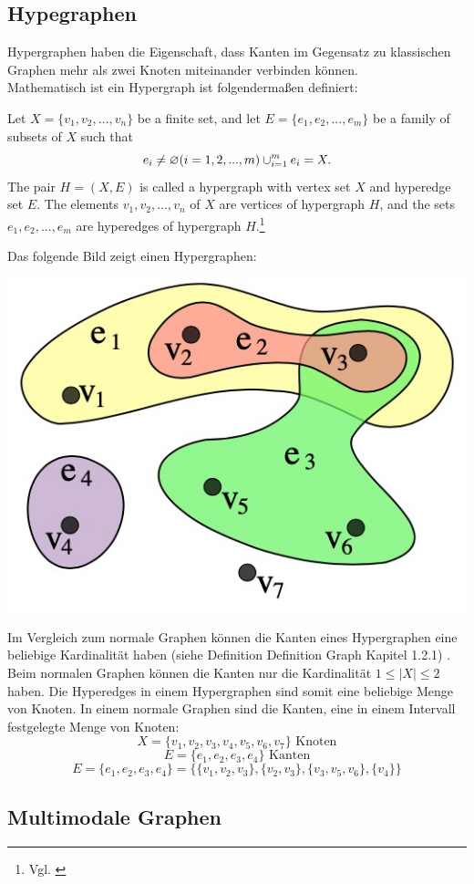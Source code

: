 \subsection{Hypegraphen}
Hypergraphen haben die Eigenschaft, dass Kanten im Gegensatz zu klassischen Graphen mehr als zwei Knoten miteinander verbinden können.
\\Mathematisch ist ein Hypergraph ist folgendermaßen definiert:
\begin{definition}
	Let $X=\{v_{1}, v_{2},...,v_{n}\}$ be a finite set,
	and let $E=\{e_{1},e_{2},...,e_{m}\}$ be a family of subsets of $X$ such that
	\[e_{i} \neq \varnothing (i=1,2,...,m) \\
	\cup_{i=1}^{m}e_{i}=X.
	\]
	The pair $H=(X,E)$ is called a hypergraph with vertex set $X$
	and hyperedge set $E$. The elements $v_{1}, v_{2},...,v_{n}$ of $X$ are vertices
	of hypergraph $H$, and the sets $e_{1}, e_{2},...,e_{m}$ are hyperedges of hypergraph $H$.\footnote{Vgl. \cite[Seite 2]{zhang2018hypergraph}}
\end{definition}
Das folgende Bild zeigt einen Hypergraphen:
\begin{center}
	\includegraphics[scale = 0.5]{./images/Hypergraph.jpg}
\end{center}
Im Vergleich zum normale Graphen können die Kanten eines Hypergraphen eine beliebige Kardinalität haben (siehe Definition Definition Graph Kapitel 1.2.1) . Beim normalen Graphen können die Kanten nur die Kardinalität $1 \leq |X| \leq 2$
haben. Die Hyperedges in einem Hypergraphen sind somit eine beliebige Menge von Knoten. In einem normale Graphen sind die Kanten, eine in einem Intervall festgelegte Menge von Knoten:
    \[X = \{v_{1}, v_{2}, v_{3}, v_{4}, v_{5}, v_{6}, v_{7}\} \text{ Knoten}\]
    \[E=\{e_{1}, e_{2}, e_{3}, e_{4}\} \text{ Kanten}\]
    \[E=\{e_{1}, e_{2}, e_{3}, e_{4}\} = \{\{v_{1}, v_{2}, v_{3}\}, \{v_{2}, v_{3}\}, \{v_{3}, v_{5}, v_{6}\}, \{v_{4}\}\} \]
\subsection{Multimodale Graphen}